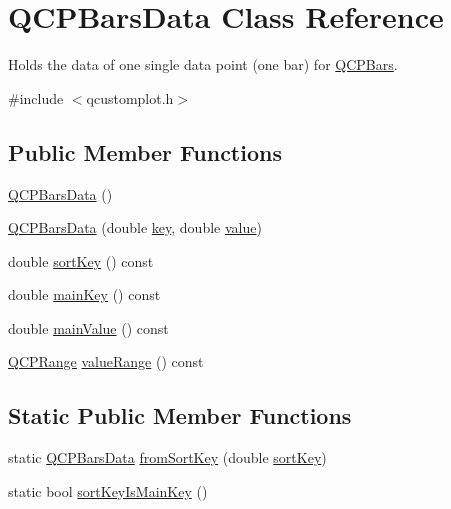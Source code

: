 \hypertarget{class_q_c_p_bars_data}{}\section{Q\+C\+P\+Bars\+Data Class Reference}
\label{class_q_c_p_bars_data}


Holds the data of one single data point (one bar) for \mbox{\hyperlink{class_q_c_p_bars}{Q\+C\+P\+Bars}}.  




{\ttfamily \#include $<$qcustomplot.\+h$>$}

\subsection*{Public Member Functions}
\begin{DoxyCompactItemize}
\item 
\mbox{\hyperlink{class_q_c_p_bars_data_a800794d4c5fea22eeb8bade20798496b}{Q\+C\+P\+Bars\+Data}} ()
\item 
\mbox{\hyperlink{class_q_c_p_bars_data_a4158816a69e2c675885f48afa2b5acc9}{Q\+C\+P\+Bars\+Data}} (double \mbox{\hyperlink{class_q_c_p_bars_data_a09b492217dc03ee1c0348a2f2e6e0a04}{key}}, double \mbox{\hyperlink{diffusion_8cpp_a4b41795815d9f3d03abfc739e666d5da}{value}})
\item 
double \mbox{\hyperlink{class_q_c_p_bars_data_a107d22d84f336bf6e3c3ad0133a5d2f6}{sort\+Key}} () const
\item 
double \mbox{\hyperlink{class_q_c_p_bars_data_a8c1d09e63b0e90a6c1fba56ddeaa8964}{main\+Key}} () const
\item 
double \mbox{\hyperlink{class_q_c_p_bars_data_a360d975e587f9e84259aaec172efb10b}{main\+Value}} () const
\item 
\mbox{\hyperlink{class_q_c_p_range}{Q\+C\+P\+Range}} \mbox{\hyperlink{class_q_c_p_bars_data_acf3e6479dacacd6c81eebe7d4cd62185}{value\+Range}} () const
\end{DoxyCompactItemize}
\subsection*{Static Public Member Functions}
\begin{DoxyCompactItemize}
\item 
static \mbox{\hyperlink{class_q_c_p_bars_data}{Q\+C\+P\+Bars\+Data}} \mbox{\hyperlink{class_q_c_p_bars_data_ad170d4e90498005ec319338910252ba8}{from\+Sort\+Key}} (double \mbox{\hyperlink{class_q_c_p_bars_data_a107d22d84f336bf6e3c3ad0133a5d2f6}{sort\+Key}})
\item 
static bool \mbox{\hyperlink{class_q_c_p_bars_data_aebaabda335bd4c9f81bd585d16b63aa8}{sort\+Key\+Is\+Main\+Key}} ()
\end{DoxyCompactItemize}
